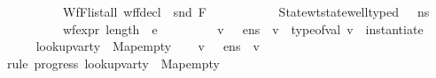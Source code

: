 \begin{isabellebody}
\ \ \ \ \ \ \ \ \ \ Wf{\isacharunderscore}{\kern0pt}F{\isacharcolon}{\kern0pt}{\isachardoublequoteopen}list{\isacharunderscore}{\kern0pt}all\ {\isacharparenleft}{\kern0pt}wf{\isacharunderscore}{\kern0pt}fdecl\ {\isasymcirc}\ snd{\isacharparenright}{\kern0pt}\ F{\isachardoublequoteclose}\ \isanewline
\ \ \ \ \ \ \ \ \ \ State{\isacharunderscore}{\kern0pt}wt{\isacharcolon}{\kern0pt}{\isachardoublequoteopen}state{\isacharunderscore}{\kern0pt}well{\isacharunderscore}{\kern0pt}typed\ {\isasymLambda}\ {\isasymOmega}\ n{\isacharunderscore}{\kern0pt}s{\isachardoublequoteclose}\ \isanewline
\ \ \ \ \ \ \ \ \ \ {\isachardoublequoteopen}wf{\isacharunderscore}{\kern0pt}expr\ {\isacharparenleft}{\kern0pt}length\ {\isasymOmega}{\isacharparenright}{\kern0pt}\ e{\isachardoublequoteclose}\isanewline
\ \ \ \ \ \ \ \ \ {\isachardoublequoteopen}{\isasymexists}v{\isachardot}{\kern0pt}\ {\isacharparenleft}{\kern0pt}{\isasymLambda}{\isacharcomma}{\kern0pt}{\isasymGamma}{\isacharcomma}{\kern0pt}{\isasymOmega}\ {\isasymturnstile}\ {\isasymlangle}e{\isacharcomma}{\kern0pt}n{\isacharunderscore}{\kern0pt}s{\isasymrangle}\ {\isasymDown}\ v{\isacharparenright}{\kern0pt}\ {\isasymand}\ type{\isacharunderscore}{\kern0pt}of{\isacharunderscore}{\kern0pt}val\ v\ {\isacharequal}{\kern0pt}\ instantiate\ {\isasymOmega}\ {\isasymtau}{\isachardoublequoteclose}\isanewline
%
\isadelimproof
%
\endisadelimproof
%
\isatagproof
{}\isamarkupfalse%
\ {\isacharminus}{\kern0pt}\isanewline
\ \ \isamarkupfalse%
\ {\isacharquery}{\kern0pt}{\isasymDelta}\ {\isacharequal}{\kern0pt}\ {\isachardoublequoteopen}{\isacharparenleft}{\kern0pt}lookup{\isacharunderscore}{\kern0pt}var{\isacharunderscore}{\kern0pt}ty\ {\isasymLambda}{\isacharcomma}{\kern0pt}\ Map{\isachardot}{\kern0pt}empty{\isacharparenright}{\kern0pt}{\isachardoublequoteclose}\isanewline
\ \ \isamarkupfalse%
\ {\isachardoublequoteopen}{\isasymexists}v{\isachardot}{\kern0pt}\ {\isasymLambda}{\isacharcomma}{\kern0pt}{\isasymGamma}{\isacharcomma}{\kern0pt}{\isasymOmega}\ {\isasymturnstile}\ {\isasymlangle}e{\isacharcomma}{\kern0pt}n{\isacharunderscore}{\kern0pt}s{\isasymrangle}\ {\isasymDown}\ v{\isachardoublequoteclose}\ \ \ \ \isanewline
\ \ \ \ \isamarkupfalse%
\ {\isacharparenleft}{\kern0pt}rule\ progress{\isacharbrackleft}{\kern0pt}\ {\isacharquery}{\kern0pt}{\isasymDelta}{\isacharequal}{\kern0pt}{\isachardoublequoteopen}{\isacharparenleft}{\kern0pt}lookup{\isacharunderscore}{\kern0pt}var{\isacharunderscore}{\kern0pt}ty\ {\isasymLambda}{\isacharcomma}{\kern0pt}\ Map{\isachardot}{\kern0pt}empty{\isacharparenright}{\kern0pt}{\isachardoublequoteclose}{\isacharbrackright}{\kern0pt}{\isacharparenright}{\kern0pt}\isanewline

\end{isabellebody}
